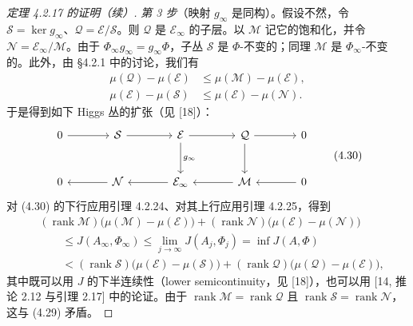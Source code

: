 \begin{proof}[定理 4.2.17 的证明（续）]
\emph{第 3 步}（映射 $g_\infty$ 是同构）。假设不然，令 $\mathcal{S}=\ker g_\infty$、$\mathcal{Q}=\mathcal{E}/\mathcal{S}$。则 $\mathcal{Q}$ 是 $\mathcal{E}_\infty$ 的子层。以 $\mathcal{M}$ 记它的饱和化，并令 $\mathcal{N}=\mathcal{E}_\infty/\mathcal{M}$。由于 $\Phi_\infty g_\infty=g_\infty\Phi$，子丛 $\mathcal{S}$ 是 $\Phi$-不变的；同理 $\mathcal{M}$ 是 $\Phi_\infty$-不变的。此外，由 §4.2.1 中的讨论，我们有
\begin{equation}
\begin{aligned}
\mu(\mathcal{Q})-\mu(\mathcal{E}) &\le \mu(\mathcal{M})-\mu(\mathcal{E}),\\
\mu(\mathcal{E})-\mu(\mathcal{S}) &\le \mu(\mathcal{E})-\mu(\mathcal{N}).
\end{aligned}
\label{eq:4.29}\tag{4.29}
\end{equation}
于是得到如下 Higgs 丛的扩张（见 [18]）：
\begin{equation}
\begin{tikzcd}[row sep=large, column sep=large]
0 \arrow[r] & \mathcal{S} \arrow[r] & \mathcal{E} \arrow[r] \arrow[d, "g_\infty"] & \mathcal{Q} \arrow[r] \arrow[d] & 0\\
0 & \mathcal{N} \arrow[l] & \mathcal{E}_\infty \arrow[l] & \mathcal{M} \arrow[l] & 0 \arrow[l]
\end{tikzcd}
\label{eq:4.30}\tag{4.30}
\end{equation}
对 (4.30) 的下行应用引理 4.2.24、对其上行应用引理 4.2.25，得到
\[
\begin{aligned}
&(\operatorname{rank}\mathcal{M})\bigl(\mu(\mathcal{M})-\mu(\mathcal{E})\bigr)
+(\operatorname{rank}\mathcal{N})\bigl(\mu(\mathcal{E})-\mu(\mathcal{N})\bigr)\\
&\qquad\le J(A_\infty,\Phi_\infty)\le\lim_{j\to\infty}J(A_j,\Phi_j)=\inf J(A,\Phi)\\
&\qquad<(\operatorname{rank}\mathcal{S})\bigl(\mu(\mathcal{E})-\mu(\mathcal{S})\bigr)
+(\operatorname{rank}\mathcal{Q})\bigl(\mu(\mathcal{Q})-\mu(\mathcal{E})\bigr),
\end{aligned}
\]
其中既可以用 $J$ 的下半连续性（lower semicontinuity，见 [18]），也可以用 [14, 推论 2.12 与引理 2.17] 中的论证。由于 $\operatorname{rank}\mathcal{M}=\operatorname{rank}\mathcal{Q}$ 且 $\operatorname{rank}\mathcal{S}=\operatorname{rank}\mathcal{N}$，这与 (4.29) 矛盾。


\end{proof}
